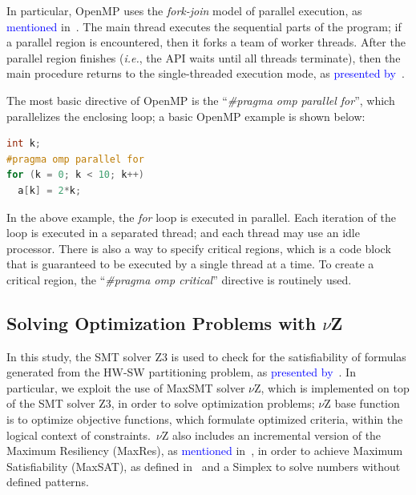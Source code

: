 \documentclass{doublecol-new}
\theoremstyle{TH}{
\newtheorem{lemma}{Lemma}
\newtheorem{theorem}[lemma]{Theorem}
\newtheorem{corrolary}[lemma]{Corrolary}
\newtheorem{conjecture}[lemma]{Conjecture}
\newtheorem{proposition}[lemma]{Proposition}
\newtheorem{claim}[lemma]{Claim}
\newtheorem{stheorem}[lemma]{Wrong Theorem}
\newtheorem{algorithm}{Algorithm}
}
\theoremstyle{THrm}{
\newtheorem{definition}{Definition}[section]
\newtheorem{question}{Question}[section]
\newtheorem{remark}{Remark}
\newtheorem{scheme}{Scheme}
}
\theoremstyle{THhit}{
\newtheorem{case}{Case}[section]
}
\begin{document}
In particular, OpenMP uses the \textit{fork-join} model of parallel execution, as \textcolor{blue}{mentioned} in~\cite{OpenMP1998}. The main thread executes the sequential parts of the program; if a parallel region is encountered, then it forks a team of worker threads. After the parallel region finishes ({\it i.e.}, the API waits until all threads terminate), then the main procedure returns to the single-threaded execution mode, as \textcolor{blue}{presented by}~\cite{Wu2014}.

The most basic directive of OpenMP is the ``\textit{\#pragma omp parallel for}'', which parallelizes the enclosing loop; a basic OpenMP example is shown below:

\begin{lstlisting}[basicstyle=\footnotesize,label={lst:example}, language=C, numberstyle=\tiny, numbersep=7pt,frame=tb,captionpos=t, caption={OpenMP basic Example.}]
int k;
#pragma omp parallel for
for (k = 0; k < 10; k++)
  a[k] = 2*k;
\end{lstlisting}

\vspace{2 mm}
In the above example, the {\it for} loop is executed in parallel. Each iteration of the loop is executed in a separated thread; and each thread may use an idle processor. There is also a way to specify critical regions, which is a code block that is guaranteed to be executed by a single thread at a time. To create a critical region, the ``\textit{\#pragma omp critical}'' directive is routinely used.

\subsection{Solving Optimization Problems with $\nu$Z}
\label{Optimization-with-Vz}

In this study, the SMT solver Z3 is used to check for the satisfiability of formulas generated from the HW-SW partitioning problem, as \textcolor{blue}{presented by}~\cite{Bjorner2014}. In particular, we exploit the use of MaxSMT solver $\nu$Z, which is implemented on top of the SMT solver Z3, in order to solve optimization problems; $\nu$Z base function is to optimize objective functions, which formulate optimized criteria, within the logical context of constraints.~$\nu$Z also includes an incremental version of the Maximum Resiliency (MaxRes), as \textcolor{blue}{mentioned} in~\cite{Federica2008}, in order to achieve Maximum Satisfiability (MaxSAT), as defined in~\cite{NarodytskaN} and a Simplex to solve numbers without defined patterns. 
\end{document}
